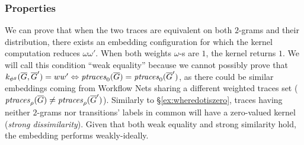 

\subsubsection{Properties}\label{subsub:prop}
We can prove that when the two traces are equivalent on both $2$-grams and their distribution,  there exists an embedding configuration for which the kernel computation reduces $\omega\omega'$. When both weights $\omega$-s are $1$, the kernel returns $1$. We will call this condition  ``weak equality'' because we cannot possibly prove that $k_{\gorgembed}(\closed{\tg},\closed{\tg}')=ww'\Leftrightarrow \ptraces{\closed{\tg}}{0}=\ptraces{\closed{\tg}'}{0}$, as there could be similar embeddings coming from Workflow Nets sharing a different weighted traces set ($\ptraces{\closed{\tg}}{\pmin}\neq\ptraces{\closed{\tg}'}{\pmin}$). Similarly to \S\ref{ex:wheredotiszero}, traces having neither $2$-grams nor transitions' labels in common will have a zero-valued kernel (\textit{strong dissimilarity}). Given that both weak equality and strong similarity hold, the embedding performs weakly-ideally.


